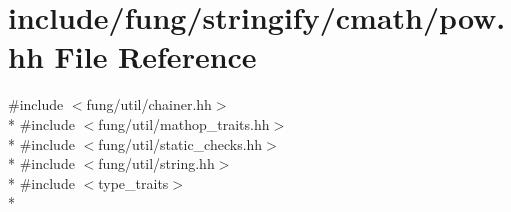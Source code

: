 \hypertarget{stringify_2cmath_2pow_8hh}{\section{include/fung/stringify/cmath/pow.hh File Reference}
\label{stringify_2cmath_2pow_8hh}
}
{\ttfamily \#include $<$fung/util/chainer.\-hh$>$}\\*
{\ttfamily \#include $<$fung/util/mathop\-\_\-traits.\-hh$>$}\\*
{\ttfamily \#include $<$fung/util/static\-\_\-checks.\-hh$>$}\\*
{\ttfamily \#include $<$fung/util/string.\-hh$>$}\\*
{\ttfamily \#include $<$type\-\_\-traits$>$}\\*
